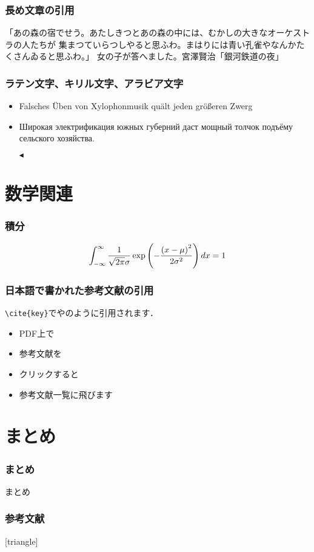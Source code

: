 \documentclass[11pt]{beamer}
\let\oldcite=\citet
\renewcommand\citet[1]{\hyperlink{#1}{\oldcite{#1}}}
\newcommand\rtltriangle{\scriptsize\raise1.25pt\hbox{\donotcoloroutermaths$\blacktriangleleft$}}
\begin{document}
\begin{frame}
    \frametitle{長め文章の引用}
    \begin{leftbar}
        「あの森の宿でせう。あたしきつとあの森の中には、むかしの大きなオーケストラの人たちが
        集まつていらつしやると思ふわ。まはりには青い孔雀やなんかたくさんゐると思ふわ。」
        女の子が答へました。\hfill 宮澤賢治「銀河鉄道の夜」
    \end{leftbar}
\end{frame}

\begin{frame}

    \frametitle{ラテン文字、キリル文字、アラビア文字}
    \setlength{\leftmargini}{1em}
    \begin{itemize}
        \item Falsches Üben von Xylophonmusik quält jeden größeren Zwerg

        \item Широкая электрификация южных губерний даст мощный толчок подъёму сельского хозяйства.
        \setRL
        \item[\rtltriangle]\hspace{1.2em}
    \end{itemize}
\end{frame}

\section{数学関連}
\begin{frame}
\frametitle{積分}
\begin{align}
    \int_{-\infty}^\infty \frac{1}{\sqrt{2\pi}\sigma}\exp\left(-\frac{\left(x - \mu\right)^2}{2\sigma^2}\right) dx = 1
\end{align}
\end{frame}

\begin{frame}
\frametitle{日本語で書かれた参考文献の引用}
\texttt{{\textbackslash}cite\{key\}}で\citet{demo}や\citet{japanese}のように引用されます．
    \begin{itemize}
        \item PDF上で
        \item 参考文献を
        \item クリックすると
        \item 参考文献一覧に飛びます
    \end{itemize}
\end{frame}

\section{まとめ}
\begin{frame}
\frametitle{まとめ}
まとめ
\end{frame}

\begin{frame}[allowframebreaks]
\frametitle{参考文献}
\begingroup
\scriptsize
    [triangle]
    
    
\endgroup
\end{frame}
\end{document}
